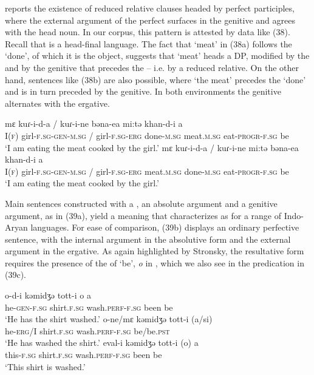 \documentclass[output=paper]{langsci/langscibook}
\begin{document}
\citet[295]{Payne1995} reports the existence of reduced relative clauses headed by perfect participles, where the external argument of the perfect  surfaces in the genitive and agrees with the head noun. In our corpus, this pattern is attested by data like (38). Recall that  is a head-final language. The fact that ‘meat’ in (38a) follows the  ‘done’, of which it is the object, suggests that ‘meat’ heads a DP, modified by the  and by the genitive that precedes the  – i.e. by a reduced relative. On the other hand, sentences like (38b) are also possible, where ‘the meat’ precedes the  ‘done’ and is in turn preceded by the genitive. In both environments the genitive alternates with the ergative.

\ea%
    \label{ex:manzini:38}
    \ea
    \gll mɛ  kuɾ-i-d-a /  kuɾ-i-ne  bəna-ea      mi:tə      khan-d-i   a\\
         I(\textsc{f})  girl-\textsc{f.sg-gen-m.sg} /  girl-\textsc{f.sg-erg}  done-\textsc{m.sg}  meat.\textsc{m.sg}  eat-\textsc{progr-f.sg}  be\\
    \glt ‘I am eating the meat cooked by the girl.’
    \ex
    \gll mɛ  kuɾ-i-d-a /   kuɾ-i-ne   mi:tə  bəna-ea     khan-d-i   a\\
         I(\textsc{f})  girl-\textsc{f.sg-gen-m.sg} /  girl-\textsc{f.sg-erg}   meat.\textsc{m.sg}  done-\textsc{m.sg}   eat-\textsc{progr-f.sg}   be\\
    \glt ‘I am eating the meat cooked by the girl.’
    \z
\z

Main sentences constructed with a , an absolute argument and a genitive argument, as in (39a), yield a meaning that \citet{Stroński2013} characterizes as  for a range of Indo-Aryan languages. For ease of comparison, (39b) displays an ordinary perfective sentence, with the internal argument in the absolutive form and the external argument in the ergative. As again highlighted by Stronsky, the resultative form requires the presence of the  of ‘be’, \textit{o} in , which we also see in the  predication in (39c).

\ea%
    \label{ex:manzini:39}
    \ea
    \gll o-d-i    kəmidʒə  tott-i       o  a\\
         he-\textsc{gen-f.sg}  shirt.\textsc{f.sg}   wash.\textsc{perf-f.sg}  been  be \\
    \glt ‘He has the shirt washed.’
    \ex 
    \gll o-ne/mɛ  kəmidʒə   tott-i       (a/si)\\
         he-\textsc{erg}/I  shirt.\textsc{f.sg}   wash.\textsc{perf-f.sg}   be/be.\textsc{pst}\\
    \glt ‘He has washed the shirt.’
    \ex 
    \gll eval-i     kəmidʒə   tott-i       (o)  a\\
         this-\textsc{f.sg}    shirt.\textsc{f.sg}   wash.\textsc{perf-f.sg}   been  be \\
    \glt ‘This shirt is washed.’
    \z
\z
\end{document}
